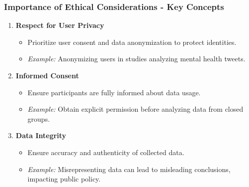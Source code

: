 \documentclass{beamer}
\begin{document}
\begin{frame}[fragile]
    \frametitle{Importance of Ethical Considerations - Key Concepts}
    \begin{enumerate}
        \item \textbf{Respect for User Privacy}
            \begin{itemize}
                \item Prioritize user consent and data anonymization to protect identities.
                \item \textit{Example:} Anonymizing users in studies analyzing mental health tweets.
            \end{itemize}
            
        \item \textbf{Informed Consent}
            \begin{itemize}
                \item Ensure participants are fully informed about data usage.
                \item \textit{Example:} Obtain explicit permission before analyzing data from closed groups.
            \end{itemize}
            
        \item \textbf{Data Integrity}
            \begin{itemize}
                \item Ensure accuracy and authenticity of collected data.
                \item \textit{Example:} Misrepresenting data can lead to misleading conclusions, impacting public policy.
            \end{itemize}
    \end{enumerate}
\end{frame}
\end{document}
